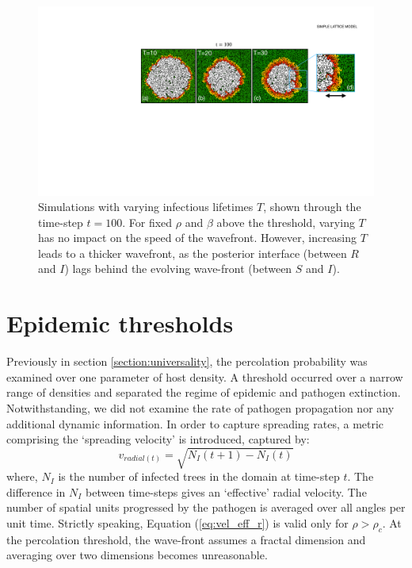\begin{figure}
    \centering
    \includegraphics[scale=0.35]{chapter3/figures/figure5_.pdf}
    \caption{Simulations with varying infectious lifetimes $T$, shown through the time-step $t=100$.
    For fixed $\rho$ and $\beta$ above the threshold, varying $T$ has no impact on the speed of the wavefront. 
    However, increasing $T$ leads to a thicker wavefront, as the posterior interface (between $R$ and $I$) lags behind the evolving wave-front (between $S$ and $I$).}
    \label{fig:slm-wave-front}
\end{figure}

\newpage

\section{Epidemic thresholds}
\label{sec:SLM-epidemic-threshold}

Previously in section \ref{section:universality}, the percolation probability was examined over one parameter of host density.
A threshold occurred over a narrow range of densities and separated the regime of epidemic and pathogen extinction.
Notwithstanding, we did not examine the rate of pathogen propagation nor any additional dynamic information.
In order to capture spreading rates, a metric comprising the `spreading velocity' is introduced, captured by: 
\begin{equation}
\label{eq:vel_eff_r}
    v_{radial(t)}=\sqrt{N_I(t+1)-N_I(t)}
\end{equation} 
where, $N_I$ is the number of infected trees in the domain at time-step $t$. 
The difference in $N_I$ between time-steps gives an `effective' radial velocity. %
The number of spatial units progressed by the pathogen is averaged over all angles per unit time. %
Strictly speaking, Equation (\ref{eq:vel_eff_r}) is valid only for $\rho > \rho_c$. At the percolation threshold, the wave-front assumes a fractal dimension and averaging over two dimensions becomes unreasonable.

